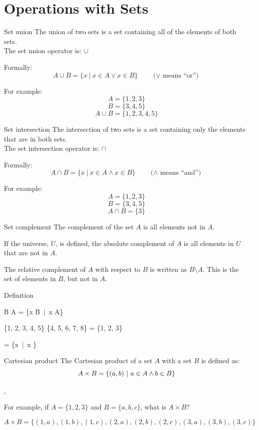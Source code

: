 	\section{Operations with Sets}
	\begin{namedframe}{Set union}
		The union of two sets is a set containing all of the elements of both sets.
		\\
		The set union operator is: $\cup$

		Formally:
		\[A \cup B = \{x\ |\ x \in A \vee x \in B\} \qquad \text{($\vee$ means ``or'')}\]

		For example:
		\[A = \{1, 2, 3\}\]
		\[B = \{3, 4, 5\}\]
		\[A \cup B = \{1, 2, 3, 4, 5\}\]
	\end{namedframe}
	\begin{namedframe}{Set intersection}
		The intersection of two sets is a set containing only the elements that are in both sets.
		\\
		The set intersection operator is: $\cap$

		Formally:
		\[A \cap B = \{x\ |\ x \in A \wedge x \in B\} \qquad \text{($\wedge$ means ``and'')}\]

		For example:
		\[A = \{1, 2, 3\}\]
		\[B = \{3, 4, 5\}\]
		\[A \cap B = \{3\}\]
	\end{namedframe}
	\begin{namedframe}{Set complement}
		The \alert{complement} of the set $A$ is all elements not in $A$.

		If the universe, $U$, is defined, the \alert{absolute complement} of $A$ is all elements in $U$ that are not in $A$.
		
		The \alert{relative complement} of $A$ with respect to $B$ is written as $B \setminus A$. This is the set of elements in $B$, but not in $A$.
		\begin{block}{Definition}
			\begin{compactmath}[\large]
				B \setminus A = \{x \in B\ |\ x \notin A\}
			\end{compactmath}
		\end{block}
		\pause
		\begin{examples}
			\begin{compactmath}
				\{1, 2, 3, 4, 5\} \setminus \{4, 5, 6, 7, 8\} = \{1, 2, 3\}
			\end{compactmath}
			\begin{compactmath}
				 \setminus {} = \{x\ |\ x \text{ is irrational}\}
			\end{compactmath}
		\end{examples}
	\end{namedframe}
	\begin{namedframe}{Cartesian product}
		The Cartesian product of a set $A$ with a set $B$ is defined as:
		\[A \times B = \{(a,b) \ |\  a \in A \wedge b \in B\}\]

		\sep

		For example, if $A = \{1,2,3\}$ and $B = \{a,b,c\}$, what is $A \times B$?

		\pause

		\[A \times B = \{(1,a),(1,b),(1,c),(2,a),(2,b),(2,c),(3,a),(3,b),(3,c)\}\]
	\end{namedframe}


